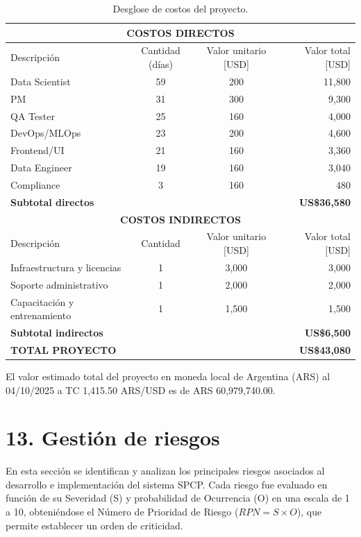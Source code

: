 \documentclass[12pt]
{charter}
\begin{document}
\begin{table}[!htbp]
\centering
\scriptsize
\caption{Desglose de costos del proyecto.}
\label{tab:costos}
\begin{tabularx}{\textwidth}{Xccr}
\toprule
\multicolumn{4}{c}{\textbf{COSTOS DIRECTOS}} \\
\midrule
Descripción & Cantidad (días) & Valor unitario [USD] & Valor total [USD] \\
\midrule
Data Scientist & 59 & 200 & 11,800 \\
PM & 31 & 300 & 9,300 \\
QA Tester & 25 & 160 & 4,000 \\
DevOps/MLOps & 23 & 200 & 4,600 \\
Frontend/UI & 21 & 160 & 3,360 \\
Data Engineer & 19 & 160 & 3,040 \\
Compliance & 3 & 160 & 480 \\
\midrule
\textbf{Subtotal directos} & & & \textbf{US\$36,580} \\
\midrule
\multicolumn{4}{c}{\textbf{COSTOS INDIRECTOS}} \\
\midrule
Descripción & Cantidad & Valor unitario [USD] & Valor total [USD] \\
\midrule
Infraestructura y licencias & 1 & 3,000 & 3,000 \\
Soporte administrativo & 1 & 2,000 & 2,000 \\
Capacitaci\'on y entrenamiento & 1 & 1,500 & 1,500 \\
\midrule
\textbf{Subtotal indirectos} & & & \textbf{US\$6,500} \\
\midrule
\textbf{TOTAL PROYECTO} & & & \textbf{US\$43,080} \\
\bottomrule
\end{tabularx}
\end{table}
\FloatBarrier

El valor estimado total del proyecto en moneda local de Argentina (ARS) al 04/10/2025 a TC 1,415.50 ARS/USD es de ARS 60,979,740.00.

\section{13. Gestión de riesgos}
\label{sec:riesgos}

En esta sección se identifican y analizan los principales riesgos asociados al desarrollo e implementación del sistema SPCP.
Cada riesgo fue evaluado en función de su Severidad (S) y probabilidad de Ocurrencia (O) en una escala de 1 a 10,
obteniéndose el Número de Prioridad de Riesgo ($RPN = S \times O$), que permite establecer un orden de criticidad. \\
\end{document}
